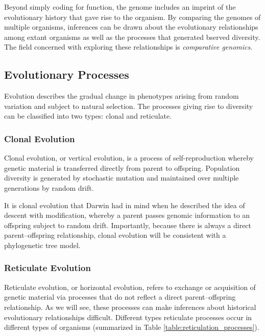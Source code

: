 Beyond simply coding for function, the genome includes an imprint of the evolutionary history that gave rise to the organism.
By comparing the genomes of multiple organisms, inferences can be drawn about the evolutionary relationships among extant organisms as well as the processes that generated bserved diversity.
The field concerned with exploring these relationships is \emph{comparative genomics}.

\subsection{Evolutionary Processes}
\label{bg:bio:evolution}

Evolution describes the gradual change in phenotypes arising from random variation and subject to natural selection.
The processes giving rise to diversity can be classified into two types: clonal and reticulate.

\subsubsection{Clonal Evolution}
\label{bg:bio:evolution:clonal}

Clonal evolution, or vertical evolution, is a process of self-reproduction whereby genetic material is transferred directly from parent to offspring.
Population diversity is generated by stochastic mutation and maintained over multiple generations by random drift.

It is clonal evolution that Darwin had in mind when he described the idea of descent with modification, whereby a parent passes genomic information to an offspring subject to random drift.
Importantly, because there is always a direct parent--offspring relationship, clonal evolution will be consistent with a phylogenetic tree model.

\subsubsection{Reticulate Evolution}
\label{bg:bio:evolution:reticulate}

Reticulate evolution, or horizontal evolution, refers to exchange or acquisition of genetic material via processes that do not reflect a direct parent--offspring relationship.
As we will see, these processes can make inferences about historical evolutionary relationships difficult.
Different types reticulate processes occur in different types of organisms (summarized in Table \ref{table:reticulation_processes}).

